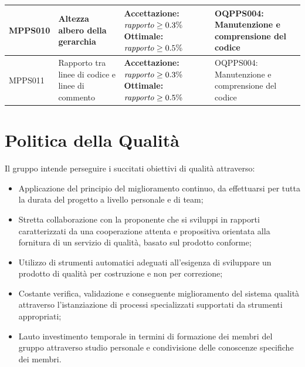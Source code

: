 \documentclass[openany,12pt,a4paper]{report}
\begin{document}
\begin{longtable}{| p{2cm} | p{3.5cm} |p{5.5cm} | p{5.5cm} |}
		\hline
		
		\newline MPPS010 &
		\newline Altezza albero della gerarchia &
		\newline \textbf{Accettazione:} \newline $ \textrm{\textit{rapporto}} \geq 0.3\% $
		\newline \textbf{Ottimale:} $ \textrm{\textit{rapporto}} \geq 0.5\% $&
		\newline OQPPS004: Manutenzione e comprensione del codice 
		\\[1em]
		
		\hline
		
		\newline MPPS011 &
		\newline Rapporto tra linee di codice e linee di commento &
		\newline \textbf{Accettazione:} \newline $ \textrm{\textit{rapporto}} \geq 0.3\% $
		\newline \textbf{Ottimale:} $ \textrm{\textit{rapporto}} \geq 0.5\% $ &
		\newline OQPPS004: Manutenzione e comprensione del codice 
		\\[1em]
		
		\hline
	\end{longtable}
	
	\section{Politica della Qualità}
	Il gruppo intende perseguire i succitati obiettivi di qualità attraverso:
	
	\begin{itemize}
		\item Applicazione del principio del miglioramento continuo, da effettuarsi per tutta la durata del progetto a livello personale e di team;
		\item Stretta collaborazione con la proponente che si sviluppi in rapporti
		caratterizzati da una cooperazione attenta e propositiva orientata alla fornitura di un servizio di qualità, basato sul prodotto conforme;
		\item Utilizzo di strumenti automatici adeguati all'esigenza di sviluppare un prodotto di qualità per costruzione e non per correzione;
		\item Costante verifica, validazione e conseguente miglioramento del sistema qualità attraverso l'istanziazione di processi specializzati supportati da strumenti appropriati;
		\item Lauto investimento temporale in termini di formazione dei membri del gruppo attraverso studio personale e condivisione delle conoscenze specifiche dei membri.
	\end{itemize}
\end{document}
